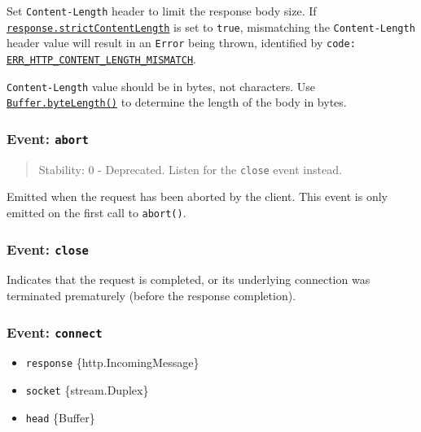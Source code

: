 Set \texttt{Content-Length} header to limit the response body size. If
\hyperref[responsestrictcontentlength]{\texttt{response.strictContentLength}}
is set to \texttt{true}, mismatching the \texttt{Content-Length} header
value will result in an \texttt{Error} being thrown, identified by
\texttt{code:}
\href{errors.md\#err_http_content_length_mismatch}{\texttt{\textquotesingle{}ERR\_HTTP\_CONTENT\_LENGTH\_MISMATCH\textquotesingle{}}}.

\texttt{Content-Length} value should be in bytes, not characters. Use
\href{buffer.md\#static-method-bufferbytelengthstring-encoding}{\texttt{Buffer.byteLength()}}
to determine the length of the body in bytes.

\subsubsection{\texorpdfstring{Event:
\texttt{\textquotesingle{}abort\textquotesingle{}}}{Event: \textquotesingle abort\textquotesingle{}}}\label{event-abort}

\begin{quote}
Stability: 0 - Deprecated. Listen for the
\texttt{\textquotesingle{}close\textquotesingle{}} event instead.
\end{quote}

Emitted when the request has been aborted by the client. This event is
only emitted on the first call to \texttt{abort()}.

\subsubsection{\texorpdfstring{Event:
\texttt{\textquotesingle{}close\textquotesingle{}}}{Event: \textquotesingle close\textquotesingle{}}}\label{event-close}

Indicates that the request is completed, or its underlying connection
was terminated prematurely (before the response completion).

\subsubsection{\texorpdfstring{Event:
\texttt{\textquotesingle{}connect\textquotesingle{}}}{Event: \textquotesingle connect\textquotesingle{}}}\label{event-connect}

\begin{itemize}
\tightlist
\item
  \texttt{response} \{http.IncomingMessage\}
\item
  \texttt{socket} \{stream.Duplex\}
\item
  \texttt{head} \{Buffer\}
\end{itemize}

